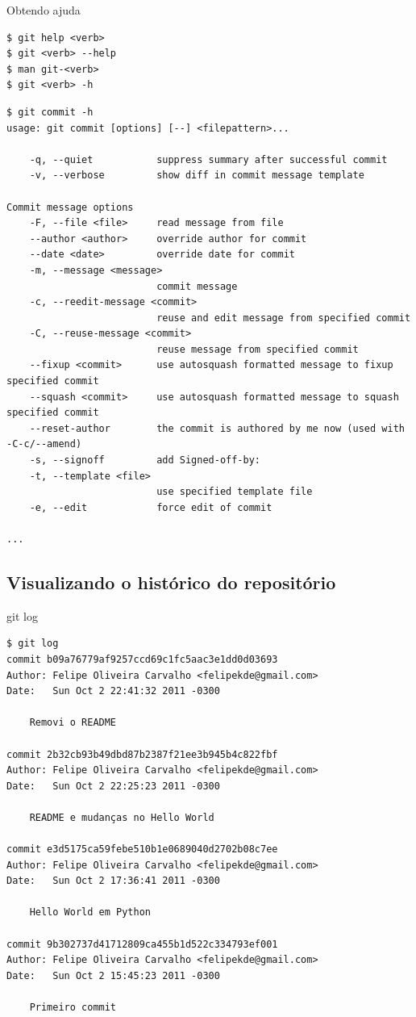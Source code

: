 \documentclass[portuguese,brazil]{beamer}
\begin{document}
\begin{frame}[fragile]{Obtendo ajuda}
\begin{verbatim}
$ git help <verb>
$ git <verb> --help
$ man git-<verb>
$ git <verb> -h
\end{verbatim}
\tiny{
\begin{verbatim}
$ git commit -h
usage: git commit [options] [--] <filepattern>...

    -q, --quiet           suppress summary after successful commit
    -v, --verbose         show diff in commit message template

Commit message options
    -F, --file <file>     read message from file
    --author <author>     override author for commit
    --date <date>         override date for commit
    -m, --message <message>
                          commit message
    -c, --reedit-message <commit>
                          reuse and edit message from specified commit
    -C, --reuse-message <commit>
                          reuse message from specified commit
    --fixup <commit>      use autosquash formatted message to fixup specified commit
    --squash <commit>     use autosquash formatted message to squash specified commit
    --reset-author        the commit is authored by me now (used with -C-c/--amend)
    -s, --signoff         add Signed-off-by:
    -t, --template <file>
                          use specified template file
    -e, --edit            force edit of commit

...
\end{verbatim}
}
\end{frame}

\subsection{Visualizando o histórico do repositório}

\begin{frame}[fragile]{git log}
\tiny{
\begin{verbatim}
$ git log
commit b09a76779af9257ccd69c1fc5aac3e1dd0d03693
Author: Felipe Oliveira Carvalho <felipekde@gmail.com>
Date:   Sun Oct 2 22:41:32 2011 -0300

    Removi o README

commit 2b32cb93b49dbd87b2387f21ee3b945b4c822fbf
Author: Felipe Oliveira Carvalho <felipekde@gmail.com>
Date:   Sun Oct 2 22:25:23 2011 -0300

    README e mudanças no Hello World

commit e3d5175ca59febe510b1e0689040d2702b08c7ee
Author: Felipe Oliveira Carvalho <felipekde@gmail.com>
Date:   Sun Oct 2 17:36:41 2011 -0300

    Hello World em Python

commit 9b302737d41712809ca455b1d522c334793ef001
Author: Felipe Oliveira Carvalho <felipekde@gmail.com>
Date:   Sun Oct 2 15:45:23 2011 -0300

    Primeiro commit
\end{verbatim}
}
\end{frame}
\end{document}
